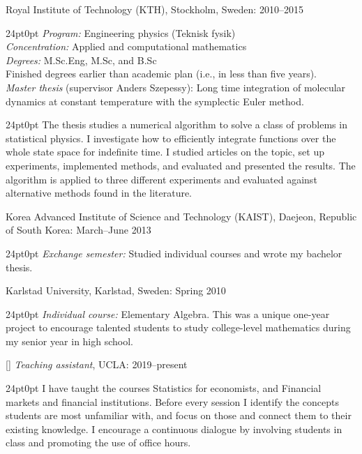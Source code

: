 \documentclass[a4paper,
10pt]{article}
\renewcommand{\section}[1]{\vspace*{6pt}\marginnote{\raggedright\bfseries{\scshape{#1}}}[\parskip]}
\renewcommand{\year}[1]{\hfill#1\ignorespaces}
\newenvironment{lista}{\vspace*{-9pt}\begin{adjustwidth}{24pt}{0pt}}{\end{adjustwidth}\vspace*{-9pt}}
\begin{document}
Royal Institute of Technology (KTH), Stockholm, Sweden: \year{2010--2015}
\begin{lista}
\emph{Program:} Engineering physics (Teknisk fysik) \\
\emph{Concentration:} Applied and computational mathematics \\
\emph{Degrees:} M.Sc.Eng, M.Sc, and B.Sc \\
Finished degrees earlier than academic plan (i.e., in less than five years). \\
\emph{Master thesis} (supervisor Anders Szepessy): Long time integration of mole\-cular dynamics at constant  temperature with the symplectic Euler method.%
\begin{lista}
The thesis studies a numerical algorithm to solve a class of problems in statistical physics. I investigate how to efficiently integrate functions over the whole state space for indefinite time. I studied articles on the topic, set up experiments, implemented methods, and evaluated and presented the results. The algorithm is applied to three different experiments and evaluated against alternative methods found in the literature.\\
\end{lista}
\end{lista}
Korea Advanced Institute of Science and Technology (KAIST), Daejeon, Republic of South Korea: \year{March--June 2013}
\begin{lista}
\emph{Exchange semester:} Studied individual courses and wrote my bachelor thesis.
\end{lista}
Karlstad University, Karlstad, Sweden: \year{Spring 2010}
\begin{lista}
\emph{Individual course:} Elementary Algebra. This was a unique one-year project to encourage talented students to study college-level mathematics during my senior year in high school.
\end{lista}

\section{WORK \\ EXPERIENCE}
\emph{Teaching assistant}, UCLA: \year{2019--present}
\begin{lista}
I have taught the courses Statistics for economists, and Financial markets and financial institutions. Before every session I identify the concepts students are most unfamiliar with, and focus on those and connect them to their existing knowledge. I encourage a continuous dialogue by involving students in class and promoting the use of office hours.
\end{lista}
\end{document}
